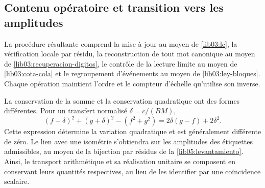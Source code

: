 \subsection{Contenu opératoire et transition vers les amplitudes}
\label{lib03:operativo}

La procédure résultante comprend la mise à jour au moyen de \eqref{lib03:lc}, la vérification locale par résidu, la reconstruction de tout mot canonique au moyen de \eqref{lib03:recuperacion-digitos}, le contrôle de la lecture limite au moyen de \eqref{lib03:cota-cola} et le regroupement d'événements au moyen de \eqref{lib03:ley-bloques}. Chaque opération maintient l'ordre et le compteur d'échelle qu'utilise son inverse.

La conservation de la somme et la conservation quadratique ont des formes
différentes. Pour un transfert normalisé
\(\delta=c/(BM)\),
\begin{equation}
 (f-\delta)^2+(g+\delta)^2-(f^2+g^2)
 =2\delta(g-f)+2\delta^2.
 \label{lib03:variacion-cuadratica}
\end{equation}
Cette expression détermine la variation quadratique et est généralement
différente de zéro. Le lien avec une isométrie s’obtiendra sur les
amplitudes des étiquettes admissibles, au moyen de la bijection par
résidus de la \cref{lib05:levantamiento}. Ainsi, le transport arithmétique
et sa réalisation unitaire se composent en conservant leurs quantités
respectives, au lieu de les identifier par une coïncidence scalaire.
